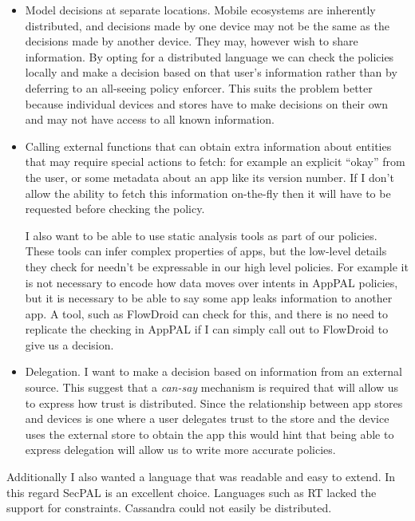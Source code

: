 \documentclass[thesis.tex]{subfiles}
\begin{document}
\begin{itemize}
  \item Model decisions at separate locations.  Mobile ecosystems are
    inherently distributed, and decisions made by one device may not be
    the same as the decisions made by another device.  They may, however
    wish to share information.  By opting for a distributed language we
    can check the policies locally and make a decision based on that
    user's information rather than by deferring to an all-seeing policy
    enforcer.  This suits the problem better because individual devices
    and stores have to make decisions on their own and may not have access
    to all known information.

  \item Calling external functions that can obtain extra information
    about entities that may require special actions to fetch: for example
    an explicit ``okay'' from the user, or some metadata about an app like
    its version number.  If I don't allow the ability to fetch this
    information on-the-fly then it will have to be requested before
    checking the policy. 

    I also want to be able to use static analysis tools as part of
    our policies.  These tools can infer complex properties of apps, but
    the low-level details they check for needn't be expressable in our
    high level policies.  For example it is not necessary to encode how
    data moves over intents in AppPAL policies, but it is necessary to be
    able to say some app leaks information to another app.  A tool, such
    as FlowDroid can check for this, and there is no need to replicate the
    checking in AppPAL if I can simply call out to FlowDroid to give us a
    decision.

  \item Delegation.  I want to make a decision based on information from an
    external source.  This suggest that a \emph{can-say} mechanism is required
    that will allow us to express how trust is distributed.   Since the
    relationship between app stores and devices is one where a user delegates
    trust to the store and the device uses the external store to obtain the app
    this would hint that being able to express delegation will allow us to write
    more accurate policies.
\end{itemize}

Additionally I also wanted a language that was readable and easy to extend.
In this regard SecPAL is an excellent choice. 
Languages such as RT lacked the support for constraints.  Cassandra could not easily be distributed. 
\end{document}
